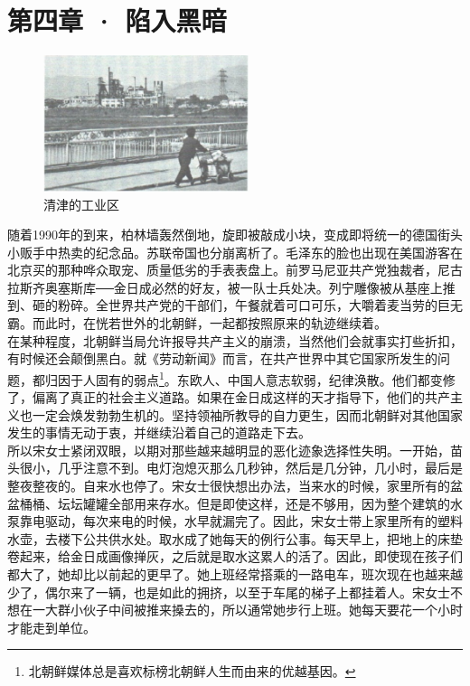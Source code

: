 \fancyhead[RO]{\thepage}
\fancyhead[LE]{\thepage}
\fancyfoot[LE,RO]{}
\fancyfoot[LO,CE]{}
\fancyfoot[CO,RE]{}
\chapter*{第四章 · 陷入黑暗}
\begin{figure}[!htbp]
	\centering
	\includegraphics[width=6cm]{./Chapters/Images/04.jpg}
	\caption*{清津的工业区}
\end{figure}


随着1990年的到来，柏林墙轰然倒地，旋即被敲成小块，变成即将统一的德国街头小贩手中热卖的纪念品。苏联帝国也分崩离析了。毛泽东的脸也出现在美国游客在北京买的那种哗众取宠、质量低劣的手表表盘上。前罗马尼亚共产党独裁者，尼古拉斯齐奥塞斯库──金日成必然的好友，被一队士兵处决。列宁雕像被从基座上推到、砸的粉碎。全世界共产党的干部们，午餐就着可口可乐，大嚼着麦当劳的巨无霸。而此时，在恍若世外的北朝鲜，一起都按照原来的轨迹继续着。\\

在某种程度，北朝鲜当局允许报导共产主义的崩溃，当然他们会就事实打些折扣，有时候还会颠倒黑白。就《劳动新闻》而言，在共产世界中其它国家所发生的问题，都归因于人固有的弱点\footnote{北朝鲜媒体总是喜欢标榜北朝鲜人生而由来的优越基因。}。东欧人、中国人意志软弱，纪律涣散。他们都变修了，偏离了真正的社会主义道路。如果在金日成这样的天才指导下，他们的共产主义也一定会焕发勃勃生机的。坚持领袖所教导的自力更生，因而北朝鲜对其他国家发生的事情无动于衷，并继续沿着自己的道路走下去。\\

所以宋女士紧闭双眼，以期对那些越来越明显的恶化迹象选择性失明。一开始，苗头很小，几乎注意不到。电灯泡熄灭那么几秒钟，然后是几分钟，几小时，最后是整夜整夜的。自来水也停了。宋女士很快想出办法，当来水的时候，家里所有的盆盆桶桶、坛坛罐罐全部用来存水。但是即使这样，还是不够用，因为整个建筑的水泵靠电驱动，每次来电的时候，水早就漏完了。因此，宋女士带上家里所有的塑料水壶，去楼下公共供水处。取水成了她每天的例行公事。每天早上，把地上的床垫卷起来，给金日成画像掸灰，之后就是取水这累人的活了。因此，即使现在孩子们都大了，她却比以前起的更早了。她上班经常搭乘的一路电车，班次现在也越来越少了，偶尔来了一辆，也是如此的拥挤，以至于车尾的梯子上都挂着人。宋女士不想在一大群小伙子中间被推来搡去的，所以通常她步行上班。她每天要花一个小时才能走到单位。\\

